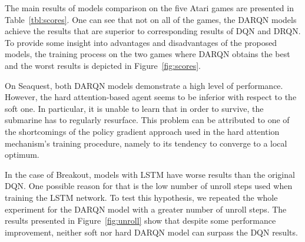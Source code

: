 \documentclass{article} \usepackage{nips15submit_e,times}
\begin{document}
The main results of models comparison on the five Atari games are presented in Table~\ref{tbl:scores}. One can see that not on all of the games, the DARQN models achieve the results that are superior to corresponding results of DQN and DRQN. To provide some insight into advantages and disadvantages of the proposed models, the training process on the two games where DARQN obtains the best and the worst results is depicted in Figure~\ref{fig:scores}. 

On Seaquest, both DARQN models demonstrate a high level of performance. However, the hard attention-based agent seems to be inferior with respect to the soft one. In particular, it is unable to learn that in order to survive, the submarine has to regularly resurface. This problem can be attributed to one of the shortcomings of the policy gradient approach used in the hard attention mechanism's training procedure, namely to its tendency to converge to a local optimum. 

In the case of Breakout, models with LSTM have worse results than the original DQN. One possible reason for that is the low number of unroll steps used when training the LSTM network. To test this hypothesis, we repeated the whole experiment for the DARQN model with a greater number of unroll steps. The results presented in Figure~\ref{fig:unroll} show that despite some performance improvement, neither soft nor hard DARQN model can surpass the DQN results.
\end{document}
